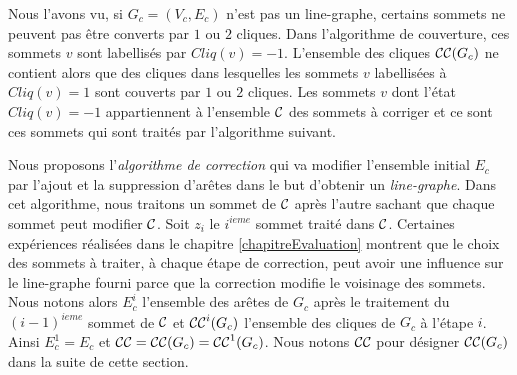 \label{algorithmeCorrection}
Nous l'avons vu, si $G_c=(V_c, E_c)$ n'est pas un line-graphe, certains sommets ne peuvent pas \^etre converts par $1$ ou $2$ cliques. Dans l'algorithme de couverture, ces sommets $v$ sont labellis\'es par $Cliq(v) = -1$. 
L'ensemble des cliques ${\cal CC}(G_c)$ ne contient alors que des cliques dans lesquelles les sommets $v$ labellis\'ees \`a $Cliq(v)=1$ sont couverts par $1$ ou $2$ cliques. 
Les sommets $v$ dont l'\'etat $Cliq(v) = -1$ appartiennent \`a l'ensemble $\cal C$ des sommets \`a corriger et ce sont ces sommets qui sont trait\'es par l'algorithme suivant.
\newline

Nous proposons l'{\em algorithme de correction} qui va modifier l'ensemble initial $E_c$ par l'ajout et la suppression d'ar\^etes dans le but d'obtenir un {\em line-graphe}.
Dans cet algorithme, nous traitons un sommet de $\cal C$ apr\`es l'autre sachant que chaque sommet peut modifier $\cal C$.
Soit $z_i$ le $i^{ieme}$ sommet trait\'e dans ${\cal C}$.
Certaines exp\'eriences r\'ealis\'ees dans le chapitre \ref{chapitreEvaluation} montrent que 
 le choix des sommets \`a traiter, \`a chaque \'etape de correction, peut avoir une influence sur le line-graphe fourni parce que la correction modifie le voisinage des sommets.
 Nous notons alors 
 $E_c^i$ l'ensemble des ar\^etes de $G_c$ apr\`es le traitement du $(i-1)^{ieme}$ sommet de ${\cal C}$ et 
 ${\cal CC}^{i}(G_c)$ l'ensemble des cliques de $G_c$ \`a l'\'etape $i$. 
 Ainsi $E_c^1 = E_c$ et ${\cal CC} = {\cal CC}(G_c) = {\cal CC}^{1}(G_c)$. 
 Nous notons ${\cal CC}$ pour d\'esigner ${\cal CC}(G_c)$ dans la suite de cette section.
 \newline


